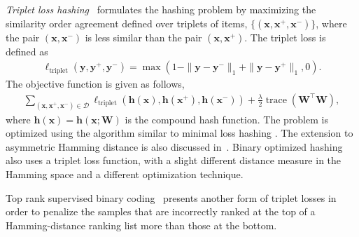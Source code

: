 \documentclass[10pt,journal,compsoc]{IEEEtran}
\begin{document}
\emph{Triplet loss hashing}~\cite{NorouziFS12} formulates the hashing problem
by maximizing the similarity order agreement
defined over
triplets of items,
$\{(\mathbf{x}, \mathbf{x}^+, \mathbf{x}^-)\}$,
where the pair $(\mathbf{x}, \mathbf{x}^-)$
is less similar than
the pair $(\mathbf{x}, \mathbf{x}^+)$.
The triplet loss is defined as
\begin{align}
\ell_{\text{triplet}} (\mathbf{y}, \mathbf{y}^+, \mathbf{y}^-)
= \max (1 - \|\mathbf{y} - \mathbf{y}^-\|_1 + \|\mathbf{y} - \mathbf{y}^+\|_1, 0).
\label{eqn:tripletlosshashing}
\end{align}
The objective function is given as follows,
\begin{align}
\sum_{(\mathbf{x}, \mathbf{x}^+, \mathbf{x}^-) \in \mathcal{D}}
\ell_{\text{triplet}} (\mathbf{h}(\mathbf{x}), \mathbf{h}(\mathbf{x}^+), \mathbf{h}(\mathbf{x}^-))
+ \frac{\lambda}{2} \operatorname{trace}{(\mathbf{W}^\top\mathbf{W})},\nonumber
\end{align}
where $\mathbf{h}(\mathbf{x}) = \mathbf{h}(\mathbf{x};\mathbf{W})$ is the compound hash function.
The problem is optimized
using the algorithm similar to minimal loss hashing \cite{NorouziF11}.
The extension to asymmetric Hamming distance is also discussed in~\cite{NorouziFS12}.
Binary optimized hashing~\cite{DaiLWJ16}
also uses a triplet loss function, with a slight different distance measure in the Hamming space
and a different optimization technique.

Top rank supervised binary coding~\cite{SongLJMS15} presents another form of triplet losses
in order to penalize the samples that are incorrectly
ranked at the top of a Hamming-distance ranking list more
than those at the bottom.
\end{document}
